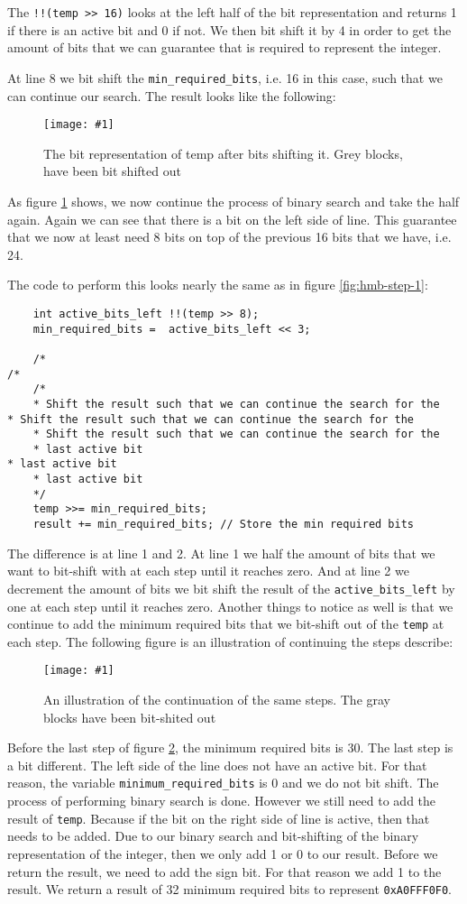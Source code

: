 \documentclass[11pt]{article}
\newcommand{\code}[1]{{\colorbox{lightgray!15}{\color{orange}\texttt{#1}}}}
\newcommand{\centeredpic}[3]{
    \begin{figure}[h]
        \texttt{[image: \#1]}
        \centering
        \caption{#2}
        \label{fig:#3}
    \end{figure}
}
\begin{document}
The \code{!!(temp >> 16)} looks at the left half of the bit representation and returns 1 if there is an active bit and 0 if not. We then bit shift it by 4 in order to get the amount of bits 
that we can guarantee that is required to represent the integer. 

At line 8 we bit shift the \code{min\_required\_bits}, i.e. 16 in this case, such that we can continue our search. The result looks like the following:
\centeredpic{howmanybits-02.png}{The bit representation of temp after bits shifting it. Grey blocks, have been bit shifted out}{hmb-step-2}

As figure \ref{fig:hmb-step-2} shows, we now continue the process of binary search and take the half again. Again we can see that there is
a bit on the left side of line. This guarantee that we now at least need 8 bits on top of the previous 16 bits that we have, i.e. 24.

The code to perform this looks nearly the same as in figure \ref{fig:hmb-step-1}:
\begin{lstlisting}
    int active_bits_left !!(temp >> 8);
    min_required_bits =  active_bits_left << 3;

    /* 
/* 
    /* 
    * Shift the result such that we can continue the search for the 
* Shift the result such that we can continue the search for the 
    * Shift the result such that we can continue the search for the 
    * last active bit 
* last active bit 
    * last active bit 
    */
    temp >>= min_required_bits;
    result += min_required_bits; // Store the min required bits
\end{lstlisting}

The difference is at line 1 and 2. At line 1 we half the amount of bits that we want to bit-shift with at each step until it reaches zero. And at line 2 we decrement the 
amount of bits we bit shift the result of the \code{active\_bits\_left} by one at each step until it reaches zero. 
Another things to notice as well is that we continue to add the minimum required bits that we bit-shift out of the \code{temp} at each step.
The following figure is an illustration of continuing the steps describe: 
\centeredpic{howmanybits-03.png}{An illustration of the continuation of the same steps. The gray blocks have been bit-shited out}{hmb-step-last}

Before the last step of figure \ref{fig:hmb-step-last}, the minimum required bits is 30. The last step is a bit different. The left side of the line does not have an active bit.
For that reason, the variable \code{minimum\_required\_bits} is 0 and we do not bit shift.
The process of performing binary search is done. However we still need to add the result of \code{temp}. Because if the bit on the right side of line is active, then that needs to be added.
Due to our binary search and bit-shifting of the binary representation of the integer, then we only add 1 or 0 to our result. 
Before we return the result, we need to add the sign bit. For that reason we add 1 to the result. We return a result of 32 minimum required bits to represent \code{0xA0FFF0F0}.
\end{document}
